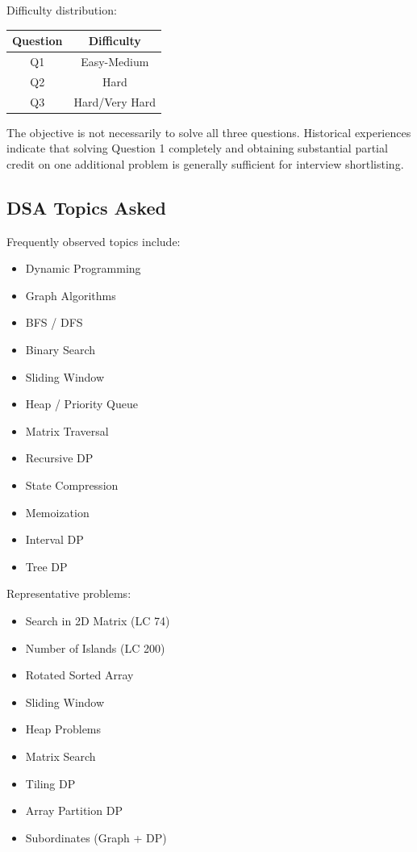 \documentclass[11pt,a4paper]{article}
\begin{document}
Difficulty distribution:

\begin{center}
	\begin{tabular}{|c|c|}
		\hline
		Question & Difficulty \\
		\hline
		Q1 & Easy-Medium \\
		Q2 & Hard \\
		Q3 & Hard/Very Hard \\
		\hline
	\end{tabular}
\end{center}

The objective is not necessarily to solve all three questions. Historical experiences indicate that solving Question 1 completely and obtaining substantial partial credit on one additional problem is generally sufficient for interview shortlisting.


\subsection{DSA Topics Asked}

Frequently observed topics include:

\begin{itemize}
	\item Dynamic Programming
	\item Graph Algorithms
	\item BFS / DFS
	\item Binary Search
	\item Sliding Window
	\item Heap / Priority Queue
	\item Matrix Traversal
	\item Recursive DP
	\item State Compression
	\item Memoization
	\item Interval DP
	\item Tree DP
\end{itemize}

Representative problems:

\begin{itemize}
	\item Search in 2D Matrix (LC 74)
	\item Number of Islands (LC 200)
	\item Rotated Sorted Array
	\item Sliding Window
	\item Heap Problems
	\item Matrix Search
	\item Tiling DP
	\item Array Partition DP
	\item Subordinates (Graph + DP)
\end{itemize}
\end{document}
